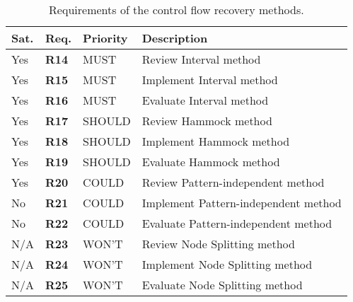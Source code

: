 \begin{table}[htbp]
	\begin{center}
		\begin{tabular}{|l|l|l|l|}
			\hline
			Sat. & Req. & Priority & Description \\
			\hline
			\rowcolor{light_green_3}
			Yes & \textbf{R14} & MUST & Review Interval method \\
			\rowcolor{light_green_3}
			Yes & \textbf{R15} & MUST & Implement Interval method \\
			\rowcolor{light_green_3}
			Yes & \textbf{R16} & MUST & Evaluate Interval method \\
			\hline
			\rowcolor{light_green_3}
			Yes & \textbf{R17} & SHOULD & Review Hammock method \\
			\rowcolor{light_green_3}
			Yes & \textbf{R18} & SHOULD & Implement Hammock method \\
			\rowcolor{light_green_3}
			Yes & \textbf{R19} & SHOULD & Evaluate Hammock method \\
			\hline
			\rowcolor{light_green_3}
			Yes & \textbf{R20} & COULD & Review Pattern-independent method \\
			\rowcolor{light_red_3}
			No & \textbf{R21} & COULD & Implement Pattern-independent method \\
			\rowcolor{light_red_3}
			No & \textbf{R22} & COULD & Evaluate Pattern-independent method \\
			\hline
			N/A & \textbf{R23} & WON'T & Review Node Splitting method \\
			N/A & \textbf{R24} & WON'T & Implement Node Splitting method \\
			N/A & \textbf{R25} & WON'T & Evaluate Node Splitting method \\
			\hline
		\end{tabular}
	\end{center}
	\caption{Requirements of the control flow recovery methods.}
	\label{tbl:eval_summary_of_control_flow_recovery_methods}
\end{table}
